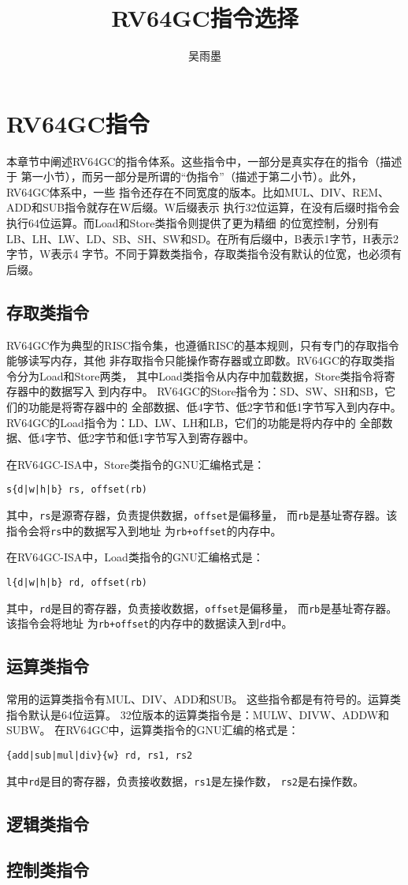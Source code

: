 \documentclass[a4paper, oneside, twocolumn]{ctexbook}
\begin{document}
\author{吴雨墨}
\title{RV64GC指令选择}
\maketitle

\tableofcontents

\chapter{RV64GC指令}
本章节中阐述RV64GC的指令体系。这些指令中，一部分是真实存在的指令（描述于
第一小节），而另一部分是所谓的“伪指令”（描述于第二小节）。此外，RV64GC体系中，一些
指令还存在不同宽度的版本。比如MUL、DIV、REM、ADD和SUB指令就存在W后缀。W后缀表示
执行32位运算，在没有后缀时指令会执行64位运算。而Load和Store类指令则提供了更为精细
的位宽控制，分别有LB、LH、LW、LD、SB、SH、SW和SD。在所有后缀中，B表示1字节，H表示2字节，W表示4
字节。不同于算数类指令，存取类指令没有默认的位宽，也必须有后缀。

\section{存取类指令}
RV64GC作为典型的RISC指令集，也遵循RISC的基本规则，只有专门的存取指令能够读写内存，其他
非存取指令只能操作寄存器或立即数。RV64GC的存取类指令分为Load和Store两类，
其中Load类指令从内存中加载数据，Store类指令将寄存器中的数据写入
到内存中。
RV64GC的Store指令为：SD、SW、SH和SB，它们的功能是将寄存器中的
全部数据、低4字节、低2字节和低1字节写入到内存中。
RV64GC的Load指令为：LD、LW、LH和LB，它们的功能是将内存中的
全部数据、低4字节、低2字节和低1字节写入到寄存器中。

在RV64GC-ISA中，Store类指令的GNU汇编格式是：
\begin{center}
\verb+s{d|w|h|b} rs, offset(rb)+
\end{center}

其中，\verb|rs|是源寄存器，负责提供数据，\verb|offset|是偏移量，
而\verb|rb|是基址寄存器。该指令会将\verb|rs|中的数据写入到地址
为\verb#rb+offset#的内存中。

在RV64GC-ISA中，Load类指令的GNU汇编格式是：
\begin{center}
\verb+l{d|w|h|b} rd, offset(rb)+
\end{center}

其中，\verb|rd|是目的寄存器，负责接收数据，\verb|offset|是偏移量，
而\verb|rb|是基址寄存器。该指令会将地址
为\verb#rb+offset#的内存中的数据读入到\verb|rd|中。

\section{运算类指令}
常用的运算类指令有MUL、DIV、ADD和SUB。
这些指令都是有符号的。运算类指令默认是64位运算。
32位版本的运算类指令是：MULW、DIVW、ADDW和SUBW。
在RV64GC中，运算类指令的GNU汇编的格式是：

\begin{center}
\verb+{add|sub|mul|div}{w} rd, rs1, rs2+
\end{center}

其中\verb|rd|是目的寄存器，负责接收数据，\verb|rs1|是左操作数，
\verb|rs2|是右操作数。

\section{逻辑类指令}

\section{控制类指令}
\end{document}

